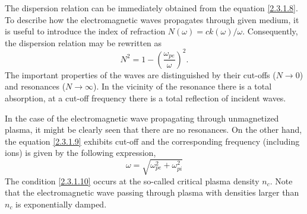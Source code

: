 The dispersion relation can be immediately obtained from the equation \ref{2.3.1.8}. To describe how the electromagnetic waves propagates through given medium, it is useful to introduce the index of refraction $ N \left( \omega \right) =  c k \left( \omega \right) / \omega $. Consequently, the dispersion relation may be rewritten as
\begin{equation}
\label{2.3.1.9}
N^{2} = 1 - \left(\frac{\omega_{pe}}{\omega}\right)^2.
\end{equation} 
The important properties of the waves are distinguished by their cut-offs ($ N \rightarrow 0 $) and resonances ($ N \rightarrow \infty $). In the vicinity of the resonance there is a total absorption, at a cut-off frequency there is a total reflection of incident waves.

In the case of the electromagnetic wave propagating through unmagnetized plasma, it might be clearly seen that there are no resonances. On the other hand, the equation \ref{2.3.1.9} exhibits cut-off and the corresponding frequency (including ions) is given by the following expression,
\begin{equation}
\label{2.3.1.10}
\omega = \sqrt{\omega_{pe}^{2} + \omega_{pi}^{2}}
\end{equation}
The condition \ref{2.3.1.10} occurs at the so-called critical plasma density $ n_c $. Note that the electromagnetic wave passing through plasma with densities larger than $ n_c $ is exponentially damped.